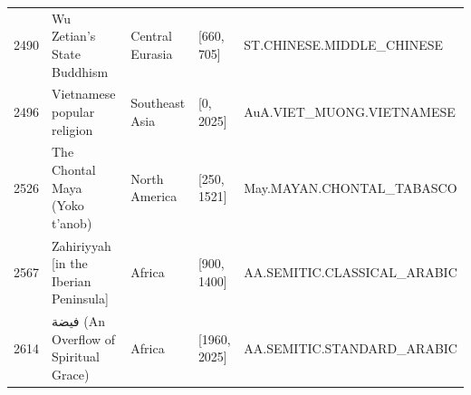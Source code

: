{\begin{longtable}{rp{3.5cm}llp{3.5cm}}
2490 & {\raggedright Wu Zetian's State Buddhism} & Central Eurasia & [660, 705] & {\raggedright ST.\allowbreak{}CHINESE.\allowbreak{}MIDDLE\_\allowbreak{}CHINESE} \\
2496 & {\raggedright Vietnamese popular religion} & Southeast Asia & [0, 2025] & {\raggedright AuA.\allowbreak{}VIET\_\allowbreak{}MUONG.\allowbreak{}VIETNAMESE} \\
2526 & {\raggedright The Chontal Maya (Yoko t’anob)} & North America & [250, 1521] & {\raggedright May.\allowbreak{}MAYAN.\allowbreak{}CHONTAL\_\allowbreak{}TABASCO} \\
2567 & {\raggedright Zahiriyyah [in the Iberian Peninsula]} & Africa & [900, 1400] & {\raggedright AA.\allowbreak{}SEMITIC.\allowbreak{}CLASSICAL\_\allowbreak{}ARABIC} \\
2614 & {\raggedright {\arabicfont فيضة} (An Overflow of Spiritual Grace)} & Africa & [1960, 2025] & {\raggedright AA.\allowbreak{}SEMITIC.\allowbreak{}STANDARD\_\allowbreak{}ARABIC} \\
\end{longtable}
}